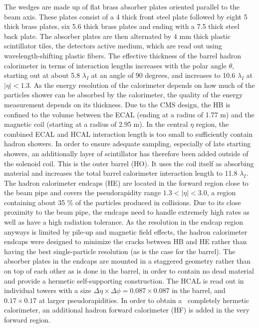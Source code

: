 The wedges are made up of flat brass absorber plates oriented parallel to the beam axis. These plates consist of a 4 \cm thick front steel plate followed by eight 5 \cm thick brass plates, six 5.6 \cm thick brass plates and ending with a 7.5 \cm thick steel back plate. The absorber plates are then alternated by 4 mm thick plastic scintillator tiles, the detectors active medium, which are read out using wavelength-shifting plastic fibers. The effective thickness of the barrel hadron calorimeter in terms of interaction lengths increases with the polar angle $\theta$, starting out at about 5.8 $\lambda_I$ at an angle of 90 degrees, and increases to 10.6 $\lambda_I$ at $|\eta|<1.3$.
As the energy resolution of the calorimeter depends on how much of the particles shower can be absorbed by the calorimeter, the quality of the energy measurement depends on its thickness. Due to the CMS design, the HB is confined to the volume between the ECAL (ending at a radius of 1.77 m) and the magnetic coil (starting at a radius of 2.95 m).
In the central $\eta$ region, the combined ECAL and HCAL interaction length is too small to sufficiently contain hadron showers. 
In order to ensure adequate sampling, especially of late starting showers, an additionally layer of scintillator has therefore been added outside of the solenoid coil. This is the outer barrel (HO). It uses the coil itself as absorbing material and increases the total barrel calorimeter interaction length to 11.8 $\lambda_I$.
The hadron calorimeter endcaps (HE) are located in the forward region close to the beam pipe and covers the pseudorapidity range $1.3 < |\eta|< 3.0$, a region containing about 35 \% of the particles produced in collisions. Due to its close proximity to the beam pipe, the endcaps need to handle extremely high rates as well as have a high radiation tolerance.
As the resolution in the endcap region anyways is limited by pile-up and magnetic field effects, the hadron calorimeter endcaps were designed to minimize the cracks between HB and HE rather than having the best single-particle resolution (as is the case for the barrel).
The absorber plates in the endcaps are mounted in a staggered geometry rather than on top of each other as is done in the barrel, in order to contain no dead material and provide a hermetic self-supporting construction.
The HCAL is read out in individual towers with a size $\Delta \eta \times \Delta \phi = 0.087 \times 0.087$ in the barrel, and $0.17 \times 0.17$ at larger pseudorapidities. 
In order to obtain a ~completely hermetic calorimeter, an additional hadron forward calorimeter (HF) is added in the very forward region.
